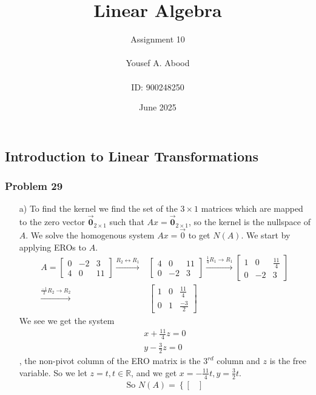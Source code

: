 \documentclass[a4paper,12pt]{article}
\title{Linear Algebra}
\author{Assignment 10\\ \\ Yousef A. Abood\\ \\ ID: 900248250}
\date{June 2025}
\begin{document}
\maketitle
\noindent\makebox[\linewidth]{\rule{15cm}{0.4pt}}
\subsection{Introduction to Linear Transformations}
\subsubsection*{Problem 29}
\begin{itemize}
    \item [a)] To find the kernel we find the set of the $3 \times 1$ matrices which are mapped to the zero vector $\vec{\textbf{0}}_{2\times 1}$ such that $Ax=\vec{\textbf{0}}_{2\times 1}$, so the kernel is the nullspace of $A$. We solve the homogenous system $Ax=\vec{0}$ to get $N(A)$. We start by applying EROs to $A.$
    \begin{align*}A=\begin{bmatrix}
      0 & -2 & 3 \\
      4 & 0 & 11
    \end{bmatrix} \xrightarrow{{R_2}\leftrightarrow{R_1}}&
    \begin{bmatrix}
      4 & 0 & 11 \\
      0 & -2 & 3
    \end{bmatrix} \xrightarrow{{\frac{1}{4}R_1}\to{R_1}}
    \begin{bmatrix}
      1 & 0 & \frac{11}{4} \\
      0 & -2 & 3
    \end{bmatrix}\\
    \xrightarrow{{\frac{-1}{2}R_2}\to{R_2}}&
    \begin{bmatrix}
      1 & 0 & \frac{11}{4} \\
      0 & 1 & \frac{-3}{2}
    \end{bmatrix}
\end{align*}
We see we get the system \begin{align*}x+\frac{11}{4}z=0 \\ y-\frac{3}{2}z=0\end{align*}, the non-pivot column of the ERO matrix is the $3^{rd}$ column and $z$ is the free variable. So we let $z=t, t\in \mathbb{R}$, and we get $x=-\frac{11}{4}t, y=\frac{3}{2}t.$
\begin{align*}
    \text{So } N(A)=
    \left\{\begin{bmatrix}

\end{bmatrix}
\end{align*}
\end{itemize}
\end{document}
